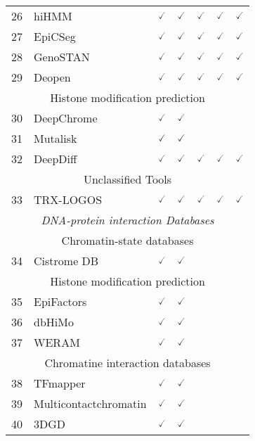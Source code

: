 \documentclass[10pt,letterpaper]{article}
\begin{document}
\begin{table}[!ht]
\begin{adjustwidth}{-2.25in}{0in}
\begin{tabular}{|c|l|c|c|c|c|c|}
26 & hiHMM\cite{sohn2015hihmm} & $\checked$ & $\checked$ & $\checked$ & $\checked$ & $\checked$ \\ 
27 & EpiCSeg\cite{mammana2015chromatin} & $\checked$ & $\checked$ & $\checked$ & $\checked$ & $\checked$ \\ 
28 & GenoSTAN\cite{zacher2017accurate} & $\checked$ & $\checked$ & $\checked$ & $\checked$ & $\checked$ \\ 
29 & Deopen\cite{liu2017chromatin} & $\checked$ & $\checked$ & $\checked$ & $\checked$ & $\checked$ \\ \hline
\hline
\multicolumn{7}{|c|}{Histone modification prediction} \\ \hline
\hline
30 & DeepChrome\cite{singh2016deepchrome} & $\checked$ & $\checked$ &  &  &  \\ 
31 & Mutalisk\cite{lee2018mutalisk} & $\checked$ & $\checked$ & & &  \\ 
32 & DeepDiff\cite{sekhon2018deepdiff} & $\checked$ & $\checked$ & $\checked$ & $\checked$ & $\checked$ \\ \hline
\hline
\multicolumn{7}{|c|}{Unclassified Tools} \\ \hline
\hline
33 & TRX-LOGOS\cite{fortin2015trx} & $\checked$ & $\checked$ & $\checked$ & $\checked$ & $\checked$ \\ \hline
\hline
\multicolumn{7}{|c|}{\textit{DNA-protein interaction Databases}} \\ \hline 
\hline
\multicolumn{7}{|c|}{Chromatin-state databases} \\ \hline
\hline
34 & Cistrome DB\cite{mei2016cistrome} & $\checked$ & $\checked$ & & &  \\ \hline
\hline
\multicolumn{7}{|c|}{Histone modification prediction} \\ \hline
\hline
35 & EpiFactors\cite{medvedeva2015epifactors} & $\checked$ & $\checked$ & &  & \\ 
36 & dbHiMo\cite{choi2015dbhimo} & $\checked$ & $\checked$ & &  & \\ 
37 & WERAM\cite{xu2016weram} &   $\checked$ & $\checked$ & &  & \\ \hline
\hline
\multicolumn{7}{|c|}{Chromatine interaction databases} \\ 
\hline
38 & TFmapper\cite{zeng2018tfmapper} & $\checked$ & $\checked$ & & &  \\ 
39 & Multicontactchromatin\cite{allahyar2017locus} & $\checked$ & $\checked$ & &  &  \\ 
40 & 3DGD\cite{li20143dgd} & $\checked$ & $\checked$ & &  &  \\ 

\end{tabular}
\end{adjustwidth}
\end{table}
\end{document}
